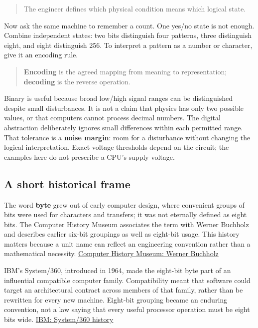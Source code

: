\begin{quote}
The engineer defines which physical condition means which logical state.
\end{quote}

Now ask the same machine to remember a count. One yes/no state is not enough. Combine independent states: two bits distinguish four patterns, three distinguish eight, and eight distinguish 256. To interpret a pattern as a number or character, give it an encoding rule.

\begin{quote}
\textbf{Encoding} is the agreed mapping from meaning to representation; \textbf{decoding} is the reverse operation.
\end{quote}

Binary is useful because broad low/high signal ranges can be distinguished despite small disturbances. It is not a claim that physics has only two possible values, or that computers cannot process decimal numbers. The digital abstraction deliberately ignores small differences within each permitted range. That tolerance is a \textbf{noise margin}: room for a disturbance without changing the logical interpretation. Exact voltage thresholds depend on the circuit; the examples here do not prescribe a CPU's supply voltage.

\subsection{A short historical frame}\label{01-foundations-i-ch001-a-short-historical-frame}

The word \textbf{byte} grew out of early computer design, where convenient groups of bits were used for characters and transfers; it was not eternally defined as eight bits. The Computer History Museum associates the term with Werner Buchholz and describes earlier six-bit groupings as well as eight-bit usage. This history matters because a unit name can reflect an engineering convention rather than a mathematical necessity. \href{https://www.computerhistory.org/tdih/october/24/}{Computer History Museum: Werner Buchholz}

IBM's System/360, introduced in 1964, made the eight-bit byte part of an influential compatible computer family. Compatibility meant that software could target an architectural contract across members of that family, rather than be rewritten for every new machine. Eight-bit grouping became an enduring convention, not a law saying that every useful processor operation must be eight bits wide. \href{https://www.ibm.com/history/system-360}{IBM: System/360 history}

